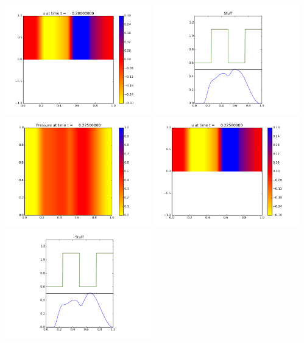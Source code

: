 \documentclass[11pt]{article}
\begin{document}
\includegraphics[width=0.475\textwidth]{frame0008fig1.png}
\vskip 10pt 
\includegraphics[width=0.475\textwidth]{frame0008fig3.png}
\vskip 10pt 
\includegraphics[width=0.475\textwidth]{frame0009fig0.png}
\includegraphics[width=0.475\textwidth]{frame0009fig1.png}
\vskip 10pt 
\includegraphics[width=0.475\textwidth]{frame0009fig3.png}
\end{document}
